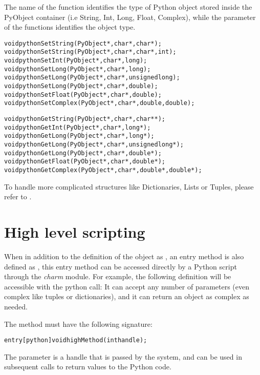 The name of the function identifies the type of Python object stored inside the
PyObject container (i.e String, Int, Long, Float, Complex), while the parameter
of the functions identifies the \CC object type.

\begin{alltt}
void pythonSetString(PyObject*, char*, char*);
void pythonSetString(PyObject*, char*, char*, int);
void pythonSetInt(PyObject*, char*, long);
void pythonSetLong(PyObject*, char*, long);
void pythonSetLong(PyObject*, char*, unsigned long);
void pythonSetLong(PyObject*, char*, double);
void pythonSetFloat(PyObject*, char*, double);
void pythonSetComplex(PyObject*, char*, double, double);

void pythonGetString(PyObject*, char*, char**);
void pythonGetInt(PyObject*, char*, long*);
void pythonGetLong(PyObject*, char*, long*);
void pythonGetLong(PyObject*, char*, unsigned long*);
void pythonGetLong(PyObject*, char*, double*);
void pythonGetFloat(PyObject*, char*, double*);
void pythonGetComplex(PyObject*, char*, double*, double*);
\end{alltt}

To handle more complicated structures like Dictionaries, Lists or Tuples, please refer to .

\section{High level scripting}
\label{pythonHighLevel}

When in addition to the definition of the \charmpp{} object as , an
entry method is also defined as , this entry method can be accessed
directly by a Python script through the {\em charm} module. For example, the
following definition will be accessible with the python call:
It can accept any number of parameters (even complex like tuples or
dictionaries), and it can return an object as complex as needed.

The method must have the following signature:

\begin{alltt}
entry [python] void highMethod(int handle);
\end{alltt}

The parameter is a handle that is passed by the system, and can be used in
subsequent calls to return values to the Python code. %

